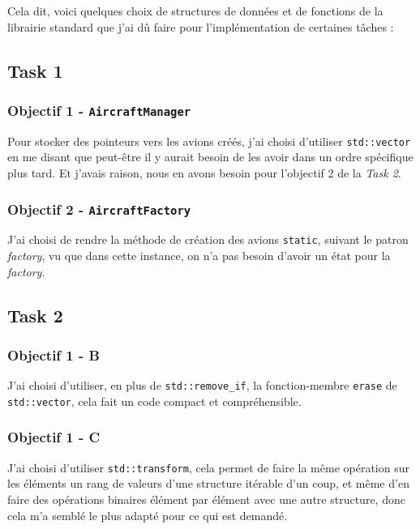 \documentclass{article}
\begin{document}
Cela dit, voici quelques choix de structures de données et de fonctions de la librairie standard que j'ai dû faire pour l'implémentation de certaines tâches :

\subsection*{Task 1}

\subsubsection*{\textbf{Objectif 1 - \texttt{AircraftManager}}}

Pour stocker des pointeurs vers les avions créés, j'ai choisi d'utiliser \texttt{std::vector} en me disant que peut-être il y aurait besoin de les avoir dans un ordre spécifique plus tard. Et j'avais raison, nous en avons besoin pour l'objectif 2 de la \textit{Task 2}.

\subsubsection*{\textbf{Objectif 2 - \texttt{AircraftFactory}}}

J'ai choisi de rendre la méthode de création des avions \texttt{static}, suivant le patron \textit{factory}, vu que dans cette instance, on n'a pas besoin d'avoir un état pour la \textit{factory}.

\subsection*{Task 2}

\subsubsection*{\textbf{Objectif 1 - B}}

J'ai choisi d'utiliser, en plus de \texttt{std::remove\_if}, la fonction-membre \texttt{erase} de \texttt{std::vector}, cela fait un code compact et compréhensible.

\subsubsection*{\textbf{Objectif 1 - C}}

J'ai choisi d'utiliser \texttt{std::transform}, cela permet de faire la même opération sur les éléments un rang de valeurs d'une structure itérable d'un coup, et même d'en faire des opérations binaires élément par élément avec une autre structure, donc cela m'a semblé le plus adapté pour ce qui est demandé.
\end{document}
